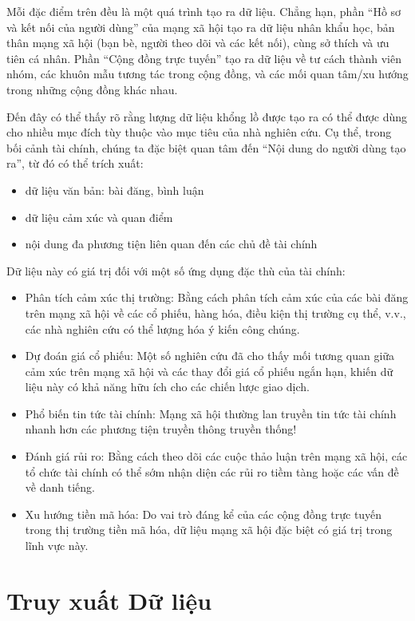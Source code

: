 Mỗi đặc điểm trên đều là một quá trình tạo ra dữ liệu. Chẳng hạn, phần ``Hồ sơ và kết nối của người dùng'' của mạng xã hội tạo ra dữ liệu nhân khẩu học, bản thân mạng xã hội (bạn bè, người theo dõi và các kết nối), cùng sở thích và ưu tiên cá nhân. Phần ``Cộng đồng trực tuyến'' tạo ra dữ liệu về tư cách thành viên nhóm, các khuôn mẫu tương tác trong cộng đồng, và các mối quan tâm/xu hướng trong những cộng đồng khác nhau.

Đến đây có thể thấy rõ rằng lượng dữ liệu khổng lồ được tạo ra có thể được dùng cho nhiều mục đích tùy thuộc vào mục tiêu của nhà nghiên cứu. Cụ thể, trong bối cảnh tài chính, chúng ta đặc biệt quan tâm đến ``Nội dung do người dùng tạo ra'', từ đó có thể trích xuất:
\begin{itemize}
  \item dữ liệu văn bản: bài đăng, bình luận
  \item dữ liệu cảm xúc và quan điểm
  \item nội dung đa phương tiện liên quan đến các chủ đề tài chính
\end{itemize}

Dữ liệu này có giá trị đối với một số ứng dụng đặc thù của tài chính:

\begin{itemize}
  \item Phân tích cảm xúc thị trường: Bằng cách phân tích cảm xúc của các bài đăng trên mạng xã hội về các cổ phiếu, hàng hóa, điều kiện thị trường cụ thể, v.v., các nhà nghiên cứu có thể lượng hóa ý kiến công chúng.
  \item Dự đoán giá cổ phiếu: Một số nghiên cứu đã cho thấy mối tương quan giữa cảm xúc trên mạng xã hội và các thay đổi giá cổ phiếu ngắn hạn, khiến dữ liệu này có khả năng hữu ích cho các chiến lược giao dịch.
  \item Phổ biến tin tức tài chính: Mạng xã hội thường lan truyền tin tức tài chính nhanh hơn các phương tiện truyền thông truyền thống!
  \item Đánh giá rủi ro: Bằng cách theo dõi các cuộc thảo luận trên mạng xã hội, các tổ chức tài chính có thể sớm nhận diện các rủi ro tiềm tàng hoặc các vấn đề về danh tiếng.
  \item Xu hướng tiền mã hóa: Do vai trò đáng kể của các cộng đồng trực tuyến trong thị trường tiền mã hóa, dữ liệu mạng xã hội đặc biệt có giá trị trong lĩnh vực này.
\end{itemize}

\section{Truy xuất Dữ liệu}

